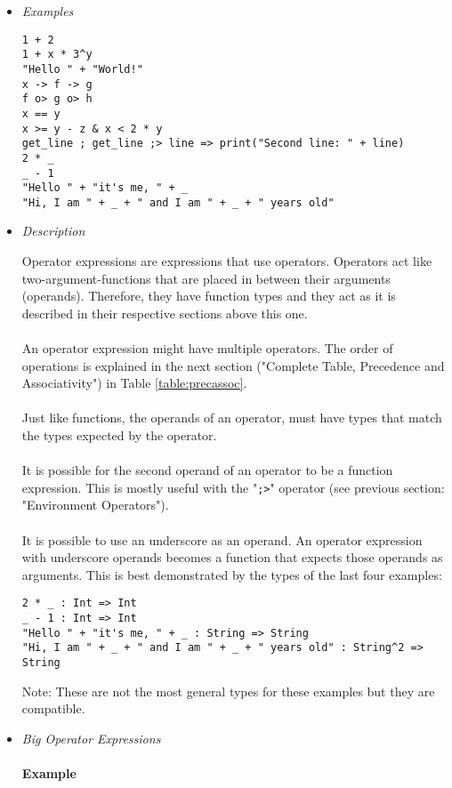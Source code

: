 \documentclass{article}
\begin{document}
\begin{itemize}
\item \textit{Examples}
\begin{verbatim}
1 + 2
1 + x * 3^y
"Hello " + "World!"
x -> f -> g
f o> g o> h
x == y
x >= y - z & x < 2 * y
get_line ; get_line ;> line => print("Second line: " + line)
2 * _
_ - 1
"Hello " + "it's me, " + _
"Hi, I am " + _ + " and I am " + _ + " years old"
\end{verbatim}

\item \textit{Description}

Operator expressions are expressions that use operators. Operators act like
two-argument-functions that are placed in between their arguments (operands).
Therefore, they have function types and they act as it is described in their
respective sections above this one.
\\\\
An operator expression might have multiple operators. The order of operations
is explained in the next section ("Complete Table, Precedence and
Associativity") in Table \ref{table:precassoc}.
\\\\
Just like functions, the operands of an operator, must have types that match
the types expected by the operator.
\\\\
It is possible for the second operand of an operator to be a function
expression.  This is mostly useful with the "\verb|;>|" operator (see
previous section: "Environment Operators").
\\\\
It is possible to use an underscore as an operand. An operator expression with
underscore operands becomes a function that expects those operands as
arguments.  This is best demonstrated by the types of the last four examples:

\begin{verbatim}
2 * _ : Int => Int
_ - 1 : Int => Int
"Hello " + "it's me, " + _ : String => String
"Hi, I am " + _ + " and I am " + _ + " years old" : String^2 => String
\end{verbatim}
Note: These are not the most general types for these examples but they are
compatible.

\newpage

\item \textit{Big Operator Expressions}\\\\
\textbf{Example}


\end{itemize}
\end{document}
